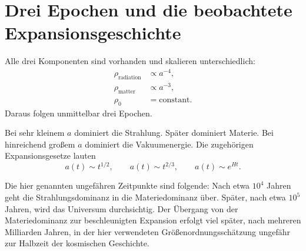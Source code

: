 \begin{classroomqa}\end{classroomqa}

\begin{classroomqa}\end{classroomqa}

\section{Drei Epochen und die beobachtete Expansionsgeschichte}

Alle drei Komponenten sind vorhanden und skalieren unterschiedlich:
\begin{equation}
\begin{aligned}
\rho_{\text{radiation}}&\propto a^{-4},\\
\rho_{\text{matter}}&\propto a^{-3},\\
\rho_0&=\text{constant}.
\end{aligned}
\end{equation}
Daraus folgen unmittelbar drei Epochen.

Bei sehr kleinem \(a\) dominiert die Strahlung. Später dominiert Materie. Bei hinreichend großem \(a\) dominiert die Vakuumenergie. Die zugehörigen Expansionsgesetze lauten
\begin{equation}
a(t)\sim t^{1/2},
\qquad
a(t)\sim t^{2/3},
\qquad
a(t)\sim e^{Ht}.
\end{equation}

Die hier genannten ungefähren Zeitpunkte sind folgende: Nach etwa \(10^4\) Jahren geht die Strahlungsdominanz in die Materiedominanz über. Später, nach etwa \(10^5\) Jahren, wird das Universum durchsichtig. Der Übergang von der Materiedominanz zur beschleunigten Expansion erfolgt viel später, nach mehreren Milliarden Jahren, in der hier verwendeten Größenordnungsschätzung ungefähr zur Halbzeit der kosmischen Geschichte.

